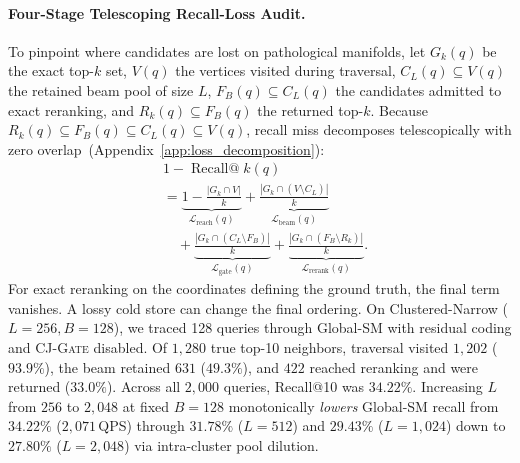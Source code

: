 \paragraph{Four-Stage Telescoping Recall-Loss Audit.}
To pinpoint where candidates are lost on pathological manifolds, let $G_k(q)$ be the exact top-$k$ set, $V(q)$ the vertices visited during traversal, $C_L(q) \subseteq V(q)$ the retained beam pool of size $L$, $F_B(q) \subseteq C_L(q)$ the candidates admitted to exact reranking, and $R_k(q) \subseteq F_B(q)$ the returned top-$k$.
Because $R_k(q) \subseteq F_B(q) \subseteq C_L(q) \subseteq V(q)$, recall miss decomposes telescopically with zero overlap\ifpreprint\ (Appendix~\ref{app:loss_decomposition})\fi:
\begingroup
{}
\begin{equation}
  \begin{aligned}
    &1 - \operatorname{Recall@}k(q) \\
    &= \underbrace{1 - \frac{|G_k \cap V|}{k}}_{\mathcal{L}_{\mathrm{reach}}(q)}
      + \underbrace{\frac{|G_k \cap (V \setminus C_L)|}{k}}_{\mathcal{L}_{\mathrm{beam}}(q)} \\
    &\quad+ \underbrace{\frac{|G_k \cap (C_L \setminus F_B)|}{k}}_{\mathcal{L}_{\mathrm{gate}}(q)}
      + \underbrace{\frac{|G_k \cap (F_B \setminus R_k)|}{k}}_{\mathcal{L}_{\mathrm{rerank}}(q)}.
  \end{aligned}
  \label{eq:four_stage_loss}
\end{equation}
\endgroup
For exact reranking on the coordinates defining the ground truth, the final term vanishes. A lossy cold store can change the final ordering.
On {Clustered-Narrow} ($L=256, B=128$), we traced 128 queries through {Global-SM} with residual coding and \textsc{CJ-Gate} disabled. Of $1{,}280$ true top-10 neighbors, traversal visited $1{,}202$ ($93.9\%$), the beam retained $631$ ($49.3\%$), and $422$ reached reranking and were returned ($33.0\%$). Across all $2{,}000$ queries, Recall@10 was $34.22\%$.
Increasing $L$ from $256$ to $2{,}048$ at fixed $B = 128$ monotonically \emph{lowers} {Global-SM} recall from $34.22\%$ ($2{,}071$\,QPS) through $31.78\%$ ($L=512$) and $29.43\%$ ($L=1{,}024$) down to $27.80\%$ ($L=2{,}048$) via intra-cluster pool dilution.

